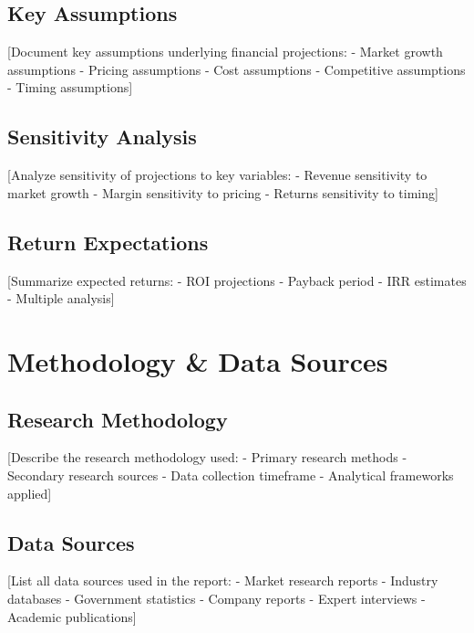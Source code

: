 \documentclass[11pt,letterpaper]{report}
\begin{document}
\section{Key Assumptions}

[Document key assumptions underlying financial projections:
- Market growth assumptions
- Pricing assumptions
- Cost assumptions
- Competitive assumptions
- Timing assumptions]

\section{Sensitivity Analysis}

[Analyze sensitivity of projections to key variables:
- Revenue sensitivity to market growth
- Margin sensitivity to pricing
- Returns sensitivity to timing]

\section{Return Expectations}

[Summarize expected returns:
- ROI projections
- Payback period
- IRR estimates
- Multiple analysis]

\appendix

\chapter{Methodology \& Data Sources}

\section{Research Methodology}

[Describe the research methodology used:
- Primary research methods
- Secondary research sources
- Data collection timeframe
- Analytical frameworks applied]

\section{Data Sources}

[List all data sources used in the report:
- Market research reports
- Industry databases
- Government statistics
- Company reports
- Expert interviews
- Academic publications]
\end{document}
